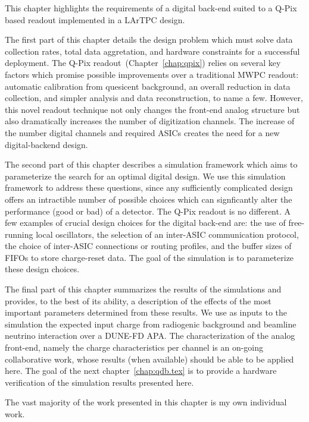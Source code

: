 This chapter highlights the requirements of a digital back-end suited to a Q-Pix based readout implemented in a LArTPC design.

The first part of this chapter details the design problem which must solve data collection rates, total data aggretation, and hardware constraints for a successful deployment.
The Q-Pix readout~(Chapter~\ref{chap:qpix}) relies on several key factors which promise possible improvements over a traditional MWPC readout: automatic calibration from quesicent background, an overall reduction in data collection, and simpler analysis and data reconstruction, to name a few.
However, this novel readout technique not only changes the front-end analog structure but also dramatically increases the number of digitization channels.
The increase of the number digital channels and required ASICs creates the need for a new digital-backend design.

The second part of this chapter describes a simulation framework which aims to parameterize the search for an optimal digital design.
We use this simulation framework to address these questions, since any sufficiently complicated design offers an intractible number of possible choices which can signficantly alter the performance (good or bad) of a detector.
The Q-Pix readout is no different.
A few examples of crucial design choices for the digital back-end are: the use of free-running local oscillators, the selection of an inter-ASIC communication protocol, the choice of inter-ASIC connections or routing profiles, and the buffer sizes of FIFOs to store charge-reset data.
The goal of the simulation is to parameterize these design choices.

The final part of this chapter summarizes the results of the simulations and provides, to the best of its ability, a description of the effects of the most important parameters determined from these results.
We use as inputs to the simulation the expected input charge from radiogenic background and beamline neutrino interaction over a DUNE-FD APA.
The characterization of the analog front-end, namely the charge characteristics per channel is an on-going collaborative work, whose results (when available) should be able to be applied here.
The goal of the next chapter~\ref{chap:qdb.tex} is to provide a hardware verification of the simulation results presented here.

The vast majority of the work presented in this chapter is my own individual work.


